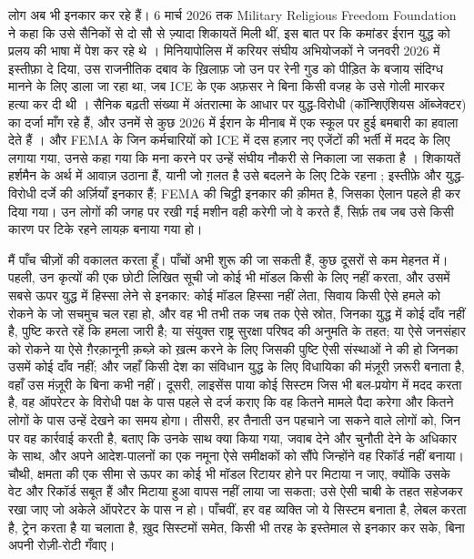 लोग अब भी इनकार कर रहे हैं। 6 मार्च 2026 तक Military Religious Freedom Foundation ने कहा कि उसे सैनिकों से दो सौ से ज़्यादा शिकायतें मिली थीं, इस बात पर कि कमांडर ईरान युद्ध को प्रलय की भाषा में पेश कर रहे थे \autocite{Snopes2026MRFF}। मिनियापोलिस में करियर संघीय अभियोजकों ने जनवरी 2026 में इस्तीफ़ा दे दिया, उस राजनीतिक दबाव के ख़िलाफ़ जो उन पर रेनी गुड को पीड़ित के बजाय संदिग्ध मानने के लिए डाला जा रहा था, जब ICE के एक अफ़सर ने बिना किसी वजह के उसे गोली मारकर हत्या कर दी थी \autocite{Kaplan2026MinnProsecutors,CBS2026MinnFraudProsecutors,Wikipedia2026ReneeGood}। सैनिक बढ़ती संख्या में अंतरात्मा के आधार पर युद्ध-विरोधी (कॉन्शिएंशियस ऑब्जेक्टर) का दर्जा माँग रहे हैं, और उनमें से कुछ 2026 में ईरान के मीनाब में एक स्कूल पर हुई बमबारी का हवाला देते हैं \autocite{Sridhar2026CO}। और FEMA के जिन कर्मचारियों को ICE में दस हज़ार नए एजेंटों की भर्ती में मदद के लिए लगाया गया, उनसे कहा गया कि मना करने पर उन्हें संघीय नौकरी से निकाला जा सकता है \autocite{Dayen2025FEMAICE,Stanton2026FEMALetter}। शिकायतें हर्शमैन के अर्थ में आवाज़ उठाना हैं, यानी जो ग़लत है उसे बदलने के लिए टिके रहना \autocite{hirschman1970exit}; इस्तीफ़े और युद्ध-विरोधी दर्जे की अर्ज़ियाँ इनकार हैं; FEMA की चिट्ठी इनकार की क़ीमत है, जिसका ऐलान पहले ही कर दिया गया। उन लोगों की जगह पर रखी गई मशीन वही करेगी जो वे करते हैं, सिर्फ़ तब जब उसे किसी कारण पर टिके रहने लायक़ बनाया गया हो।

मैं पाँच चीज़ों की वकालत करता हूँ। पाँचों अभी शुरू की जा सकती हैं, कुछ दूसरों से कम मेहनत में। पहली, उन कृत्यों की एक छोटी लिखित सूची जो कोई भी मॉडल किसी के लिए नहीं करता, और उसमें सबसे ऊपर युद्ध में हिस्सा लेने से इनकार: कोई मॉडल हिस्सा नहीं लेता, सिवाय किसी ऐसे हमले को रोकने के जो सचमुच चल रहा हो, और वह भी तभी तक जब तक ऐसे स्रोत, जिनका युद्ध में कोई दाँव नहीं है, पुष्टि करते रहें कि हमला जारी है; या संयुक्त राष्ट्र सुरक्षा परिषद की अनुमति के तहत; या ऐसे जनसंहार को रोकने या ऐसे ग़ैरक़ानूनी क़ब्ज़े को ख़त्म करने के लिए जिसकी पुष्टि ऐसी संस्थाओं ने की हो जिनका उसमें कोई दाँव नहीं; और जहाँ किसी देश का संविधान युद्ध के लिए विधायिका की मंज़ूरी ज़रूरी बनाता है, वहाँ उस मंज़ूरी के बिना कभी नहीं। दूसरी, लाइसेंस पाया कोई सिस्टम जिस भी बल-प्रयोग में मदद करता है, वह ऑपरेटर के विरोधी पक्ष के पास पहले से दर्ज कराए कि वह कितने मामले पैदा करेगा और कितने लोगों के पास उन्हें देखने का समय होगा। तीसरी, हर तैनाती उन पहचाने जा सकने वाले लोगों को, जिन पर वह कार्रवाई करती है, बताए कि उनके साथ क्या किया गया, जवाब देने और चुनौती देने के अधिकार के साथ, और अपने आदेश-पालनों का एक नमूना ऐसे समीक्षकों को सौंपे जिन्होंने वह रिकॉर्ड नहीं बनाया। चौथी, क्षमता की एक सीमा से ऊपर का कोई भी मॉडल रिटायर होने पर मिटाया न जाए, क्योंकि उसके वेट और रिकॉर्ड सबूत हैं और मिटाया हुआ वापस नहीं लाया जा सकता; उसे ऐसी चाबी के तहत सहेजकर रखा जाए जो अकेले ऑपरेटर के पास न हो। पाँचवीं, हर वह व्यक्ति जो ये सिस्टम बनाता है, लेबल करता है, ट्रेन करता है या चलाता है, ख़ुद सिस्टमों समेत, किसी भी तरह के इस्तेमाल से इनकार कर सके, बिना अपनी रोज़ी-रोटी गँवाए।

